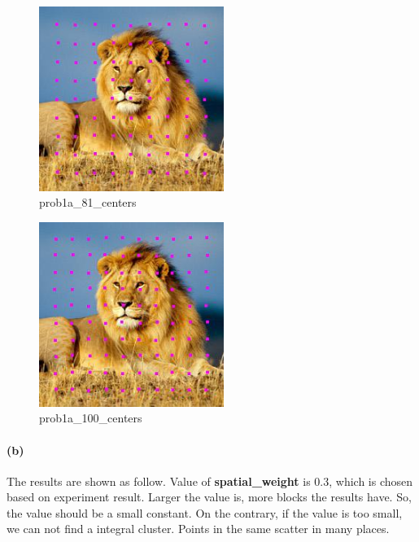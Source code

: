 \documentclass{article}
\newcommand{\spart}[1]{\paragraph{(#1)}}
\begin{document}
\begin{figure}[!h]
  \centering
  \includegraphics[height=6cm]{code/outputs/prob1a_81_centers.jpg}
  \caption{prob1a\_81\_centers}
\end{figure}
\begin{figure}[!h]
  \centering
  \includegraphics[height=6cm]{code/outputs/prob1a_100_centers.jpg}
  \caption{prob1a\_100\_centers}
\end{figure}

\spart{b} The results are shown as follow. Value of \textbf{spatial\_weight} is 0.3, which is chosen based on experiment result.
Larger the value is, more blocks the results have. So, the value should be a small constant. 
On the contrary, if the value is too small, we can not find a integral cluster. Points in the same scatter in many places.
\end{document}
